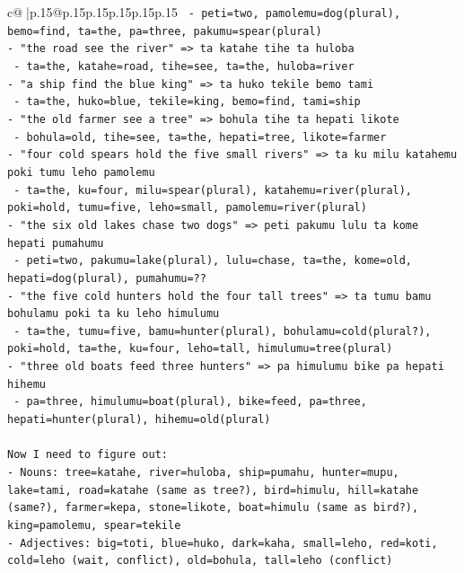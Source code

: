 \documentclass{article}
\begin{document}
{\begin{supertabular}{c@{$\;$}|p{.15\linewidth}@{}p{.15\linewidth}p{.15\linewidth}p{.15\linewidth}p{.15\linewidth}p{.15\linewidth}}
{{{\texttt{  {-} peti=two, pamolemu=dog(plural), bemo=find, ta=the, pa=three, pakumu=spear(plural)} \\
\texttt{{-} "the road see the river" => ta katahe tihe ta huloba} \\
\texttt{  {-} ta=the, katahe=road, tihe=see, ta=the, huloba=river} \\
\texttt{{-} "a ship find the blue king" => ta huko tekile bemo tami} \\
\texttt{  {-} ta=the, huko=blue, tekile=king, bemo=find, tami=ship} \\
\texttt{{-} "the old farmer see a tree" => bohula tihe ta hepati likote} \\
\texttt{  {-} bohula=old, tihe=see, ta=the, hepati=tree, likote=farmer} \\
\texttt{{-} "four cold spears hold the five small rivers" => ta ku milu katahemu poki tumu leho pamolemu} \\
\texttt{  {-} ta=the, ku=four, milu=spear(plural), katahemu=river(plural), poki=hold, tumu=five, leho=small, pamolemu=river(plural)} \\
\texttt{{-} "the six old lakes chase two dogs" => peti pakumu lulu ta kome hepati pumahumu} \\
\texttt{  {-} peti=two, pakumu=lake(plural), lulu=chase, ta=the, kome=old, hepati=dog(plural), pumahumu=??} \\
\texttt{{-} "the five cold hunters hold the four tall trees" => ta tumu bamu bohulamu poki ta ku leho himulumu} \\
\texttt{  {-} ta=the, tumu=five, bamu=hunter(plural), bohulamu=cold(plural?), poki=hold, ta=the, ku=four, leho=tall, himulumu=tree(plural)} \\
\texttt{{-} "three old boats feed three hunters" => pa himulumu bike pa hepati hihemu} \\
\texttt{  {-} pa=three, himulumu=boat(plural), bike=feed, pa=three, hepati=hunter(plural), hihemu=old(plural)} \\
\\ 
\texttt{Now I need to figure out:} \\
\texttt{{-} Nouns: tree=katahe, river=huloba, ship=pumahu, hunter=mupu, lake=tami, road=katahe (same as tree?), bird=himulu, hill=katahe (same?), farmer=kepa, stone=likote, boat=himulu (same as bird?), king=pamolemu, spear=tekile} \\
\texttt{{-} Adjectives: big=toti, blue=huko, dark=kaha, small=leho, red=koti, cold=leho (wait, conflict), old=bohula, tall=leho (conflict)} \\
}}}
\end{supertabular}}
\end{document}
